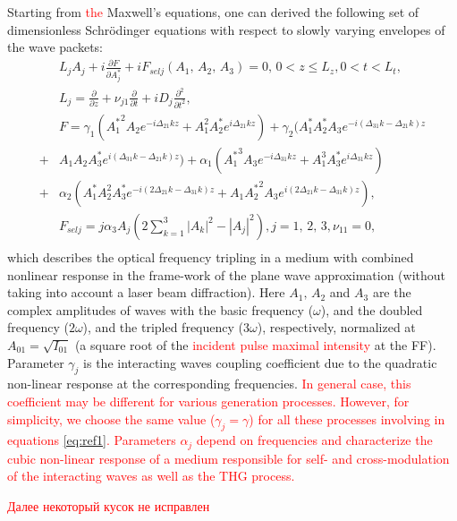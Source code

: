 \documentclass[a4paper, 12pt, onecolumn]{extarticle}
\begin{document}
Starting from \textcolor{red}{the} Maxwell's equations,  one can derived the following set of dimensionless Schr\"{o}dinger equations with respect to slowly varying envelopes of the wave packets:
\begin{equation}
\label{eq:ref1}
\begin{aligned}
&L_jA_j+i\frac{\partial F}{\partial A_j^*}+iF_{selj}(A_1,\,A_2,\,A_3)=0,\,0< z \leq L_z , 0<t<L_t,\\
&L_j=\frac{\partial}{\partial z}+\nu_{j1}\frac{\partial}{\partial t}+iD_j\frac{\partial^2}{\partial t^2},\\
&F=\gamma_1({A_1^*}^2A_2e^{-i\Delta_{21} kz}+A_1^2A_2^*e^{i\Delta_{21} kz})+\gamma_2 (A_1^*A_2^* A_3e^{-i(\Delta_{31}k-\Delta_{21}k)z}\\
+&A_1A_2A_3^*e^{i(\Delta_{31}k-\Delta_{21}k)z})+\alpha_1({A_1^*}^3 A_3 e^{-i\Delta_{31}kz}+A_1^3 A_3^* e^{i\Delta_{31}kz})\\
+&\alpha_2(A_1^*A_2^2 A_3^*e^{-i(2\Delta_{21}k-\Delta_{31}k )z}+A_1{A_2^*}^2 A_3e^{i(2\Delta_{21}k-\Delta_{31}k )z}),\\
&F_{selj}=j\alpha_3 A_j(2\sum\limits_{k=1}^3 |A_k|^2-|A_j|^2), j=1,\,2,\,3, \nu_{11}=0,\\
\end{aligned}
\end{equation}
which describes the optical frequency tripling in a medium with combined nonlinear response in the frame-work of the plane wave approximation (without taking into account a laser beam diffraction). 
Here \(A_1,\,A_2\) and \(A_3\) are the complex amplitudes of waves with the basic frequency (\(\omega\)), and the doubled frequency (\(2\omega\)), and the tripled frequency (\(3\omega\)), respectively, normalized at \(A_{01}=\sqrt{I_{01}}\) (a square root of the \textcolor{red}{ incident pulse maximal intensity} at the FF). Parameter \(\gamma_j\) is the interacting waves coupling coefficient  due to the quadratic non-linear response at the corresponding frequencies. \textcolor{red}{ In general case, this coefficient may be different for various generation processes. However, for simplicity, we choose the same value (\(\gamma_j=\gamma\)) for all these processes involving in equations \eqref{eq:ref1}. Parameters \(\alpha_j\) depend on frequencies and characterize the cubic non-linear response of a medium responsible  for self-  and cross-modulation of the interacting waves as well as  the THG process.} 

\textcolor{red}{Далее некоторый кусок не  исправлен}
\end{document}
